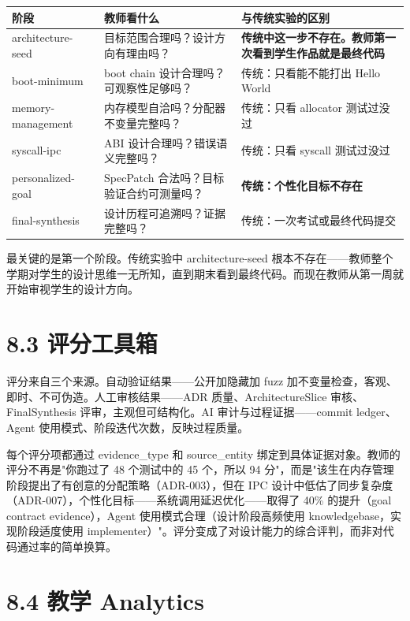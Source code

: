 \documentclass[UTF8,a4paper,12pt,openany]{ctexrep}
\begin{document}
{\def\LTcaptype{none} %
\begin{longtable}{@{}Y{0.18\textwidth}Y{0.38\textwidth}Y{0.36\textwidth}@{}}
\toprule\noalign{}
阶段 & 教师看什么 & 与传统实验的区别 \\
\midrule\noalign{}
\endhead
\bottomrule\noalign{}
\endlastfoot
architecture-seed & 目标范围合理吗？设计方向有理由吗？ & \textbf{传统中这一步不存在。教师第一次看到学生作品就是最终代码} \\
boot-minimum & boot chain 设计合理吗？可观察性足够吗？ & 传统：只看能不能打出 Hello World \\
memory-management & 内存模型自洽吗？分配器不变量完整吗？ & 传统：只看 allocator 测试过没过 \\
syscall-ipc & ABI 设计合理吗？错误语义完整吗？ & 传统：只看 syscall 测试过没过 \\
personalized-goal & SpecPatch 合法吗？目标验证合约可测量吗？ & \textbf{传统：个性化目标不存在} \\
final-synthesis & 设计历程可追溯吗？证据完整吗？ & 传统：一次考试或最终代码提交 \\
\end{longtable}
}

最关键的是第一个阶段。传统实验中 architecture-seed 根本不存在------教师整个学期对学生的设计思维一无所知，直到期末看到最终代码。而现在教师从第一周就开始审视学生的设计方向。

\section{8.3 评分工具箱}\label{83-ux8bc4ux5206ux5de5ux5177ux7bb1}

评分来自三个来源。自动验证结果------公开加隐藏加 fuzz 加不变量检查，客观、即时、不可伪造。人工审核结果------ADR 质量、ArchitectureSlice 审核、FinalSynthesis 评审，主观但可结构化。AI 审计与过程证据------commit ledger、Agent 使用模式、阶段迭代次数，反映过程质量。

每个评分项都通过 evidence\_type 和 source\_entity 绑定到具体证据对象。教师的评分不再是"你跑过了 48 个测试中的 45 个，所以 94 分"，而是"该生在内存管理阶段提出了有创意的分配策略（ADR-003），但在 IPC 设计中低估了同步复杂度（ADR-007），个性化目标------系统调用延迟优化------取得了 40\% 的提升（goal contract evidence），Agent 使用模式合理（设计阶段高频使用 knowledgebase，实现阶段适度使用 implementer）"。评分变成了对设计能力的综合评判，而非对代码通过率的简单换算。

\section{8.4 教学 Analytics}\label{84-ux6559ux5b66-analytics}
\end{document}
